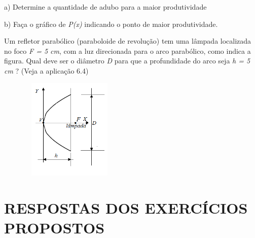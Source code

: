 \begin{enumerate}[label=\thechapter.\arabic*]
a) Determine a quantidade de adubo para a maior produtividade

b) Faça o gráfico de \textit{P(x) }indicando o ponto de maior produtividade.

\exitem{} Um refletor parabólico (paraboloide de revolução) tem uma lâmpada localizada no foco \textit{F = 5 cm}, com a luz direcionada para o arco parabólico, como indica a figura. Qual deve ser o diâmetro \textit{D} para que a profundidade do arco seja \textit{h = 5 cm} ? (Veja a aplicação 6.4)

\begin{figure}[H]
	\begin{Center}
		\includegraphics[width=1.85in,height=1.9in]{capitulos/funcao_do_segundo_grau/media/image25.png}
	\end{Center}
\end{figure}
\end{enumerate}

\section{RESPOSTAS DOS EXERCÍCIOS PROPOSTOS}

